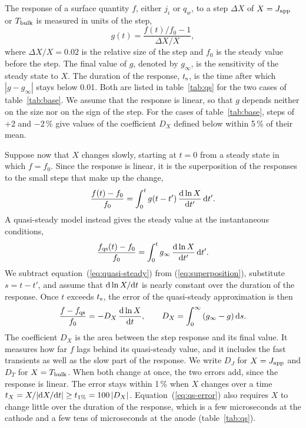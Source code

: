 The response of a surface quantity \(f\), either \(j_i\) or \(q_w\), to a step \(\Delta X\) of \(X=J_{\rm app}\) or \(T_{\rm bulk}\) is measured in units of the step,
\begin{equation}
g(t)=\frac{f(t)/f_0-1}{\Delta X/X},
\label{eq:g}
\end{equation}
where \(\Delta X/X=0.02\) is the relative size of the step and \(f_0\) is the steady value before the step. The final value of \(g\), denoted by \(g_\infty\), is the sensitivity of the steady state to \(X\). The duration of the response, \(t_{\rm s}\), is the time after which \(|g-g_\infty|\) stays below 0.01. Both are listed in table~\ref{tab:qs} for the two cases of table~\ref{tab:base}. We assume that the response is linear, so that \(g\) depends neither on the size nor on the sign of the step. For the cases of table~\ref{tab:base}, steps of \(+2\) and \(-2\,\%\) give values of the coefficient \(D_X\) defined below within 5\,\% of their mean.

Suppose now that \(X\) changes slowly, starting at \(t=0\) from a steady state in which \(f=f_0\). Since the response is linear, it is the superposition of the responses to the small steps that make up the change,
\begin{equation}
\frac{f(t)-f_0}{f_0}=\int_0^t g(t-t')\,\frac{{\rm d}\ln X}{{\rm d}t'}\,{\rm d}t' .
\label{eq:superposition}
\end{equation}
A quasi-steady model instead gives the steady value at the instantaneous conditions,
\begin{equation}
\frac{f_{\rm qs}(t)-f_0}{f_0}=\int_0^t g_\infty\,\frac{{\rm d}\ln X}{{\rm d}t'}\,{\rm d}t' .
\label{eq:quasi-steady}
\end{equation}
We subtract equation~(\ref{eq:quasi-steady}) from (\ref{eq:superposition}), substitute \(s=t-t'\), and assume that \({\rm d}\ln X/{\rm d}t\) is nearly constant over the duration of the response. Once \(t\) exceeds \(t_{\rm s}\), the error of the quasi-steady approximation is then
\begin{equation}
\frac{f-f_{\rm qs}}{f_0}=-D_X\,\frac{{\rm d}\ln X}{{\rm d}t},
\qquad D_X=\int_0^\infty\left(g_\infty-g\right){\rm d}s .
\label{eq:qs-error}
\end{equation}
The coefficient \(D_X\) is the area between the step response and its final value. It measures how far \(f\) lags behind its quasi-steady value, and it includes the fast transients as well as the slow part of the response. We write \(D_J\) for \(X=J_{\rm app}\) and \(D_T\) for \(X=T_{\rm bulk}\). When both change at once, the two errors add, since the response is linear. The error stays within 1\,\% when \(X\) changes over a time \(t_X=X/|{\rm d}X/{\rm d}t|\ge t_{1\%}=100\,|D_X|\). Equation~(\ref{eq:qs-error}) also requires \(X\) to change little over the duration of the response, which is a few microseconds at the cathode and a few tens of microseconds at the anode (table~\ref{tab:qs}).

